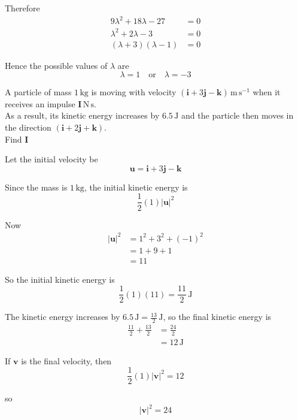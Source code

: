 \documentclass[leqno]{article}
\begin{document}
\begin{enumerate}[
  label=\textbf{\arabic*.},
  leftmargin=*,
  topsep=0pt,
  partopsep=0pt,
  parsep=0pt
]
\begin{djsSolution}
Therefore
\begin{align*}
9\lambda^2+18\lambda-27&=0 \\
\lambda^2+2\lambda-3&=0 \\
(\lambda+3)(\lambda-1)&=0
\end{align*}

Hence the possible values of $\lambda$ are
\[
\lambda=1 \quad \text{or} \quad \lambda=-3
\]
\end{djsSolution}


\newpage

\questionitem

A particle of mass $1\,\mathrm{kg}$ is moving with velocity $(\mathbf{i}+3\mathbf{j}-\mathbf{k})\,\mathrm{m\,s^{-1}}$ when it receives an impulse $\mathbf{I}\,\mathrm{N\,s}$. \\

As a result, its kinetic energy increases by $6.5\,\mathrm{J}$ and the particle then moves in the direction $(\mathbf{i}+2\mathbf{j}+\mathbf{k})$. \\

Find $\mathbf{I}$ 

\vspace*{10pt}

\begin{djsSolution}
Let the initial velocity be
\[
\mathbf{u}=\mathbf{i}+3\mathbf{j}-\mathbf{k}
\]

Since the mass is \(1\,\mathrm{kg}\), the initial kinetic energy is
\[
\frac12(1)|\mathbf{u}|^2
\]

Now
\begin{align*}
|\mathbf{u}|^2&=1^2+3^2+(-1)^2\\
&=1+9+1\\
&=11
\end{align*}

So the initial kinetic energy is
\[
\frac12(1)(11)=\frac{11}{2}\,\mathrm{J}
\]

The kinetic energy increases by \(6.5\,\mathrm{J}=\frac{13}{2}\,\mathrm{J}\), so the final kinetic energy is
\begin{align*}
\frac{11}{2}+\frac{13}{2}&=\frac{24}{2}\\
&=12\,\mathrm{J}
\end{align*}

If \(\mathbf{v}\) is the final velocity, then
\[
\frac12(1)|\mathbf{v}|^2=12
\]

so
\[
|\mathbf{v}|^2=24
\]


\end{djsSolution}
\end{enumerate}
\end{document}
